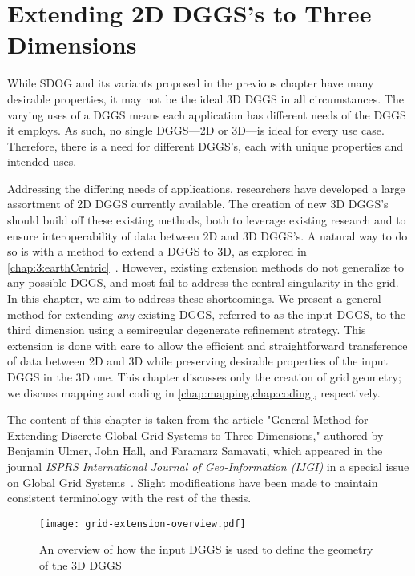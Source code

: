 \chapter{Extending 2D DGGS's to Three Dimensions} \label{chap:extension}
While SDOG and its variants proposed in the previous chapter have many desirable properties, it may not be the ideal 3D DGGS in all circumstances.
The varying uses of a DGGS means each application has different needs of the DGGS it employs.
As such, no single DGGS---2D or 3D---is ideal for every use case.
Therefore, there is a need for different DGGS's, each with unique properties and intended uses.


Addressing the differing needs of applications, researchers have developed a large assortment of 2D DGGS currently available.
The creation of new 3D DGGS's should build off these existing methods, both to leverage existing research and to ensure interoperability of data between 2D and 3D DGGS's.
A natural way to do so is with a method to extend a DGGS to 3D, as explored in \cref{chap:3:earthCentric}~\cite{xie2013interactive,sirdeshmukh2019utilizing,wang2013global}.
However, existing extension methods do not generalize to any possible DGGS, and most fail to address the central singularity in the grid.
In this chapter, we aim to address these shortcomings.
We present a general method for extending \textit{any} existing DGGS, referred to as the input DGGS, to the third dimension using a semiregular degenerate refinement strategy.
This extension is done with care to allow the efficient and straightforward transference of data between 2D and 3D while preserving desirable properties of the input DGGS in the 3D one.
This chapter discusses only the creation of grid geometry; we discuss mapping and coding in \cref{chap:mapping,chap:coding}, respectively.


The content of this chapter is taken from the article "General Method for Extending Discrete Global Grid Systems to Three Dimensions," authored by Benjamin Ulmer, John Hall, and Faramarz Samavati, which appeared in the journal \textit{ISPRS International Journal of Geo-Information (IJGI)} in a special issue on Global Grid Systems~\cite{ulmer2020general}.
Slight modifications have been made to maintain consistent terminology with the rest of the thesis.


\begin{figure}[ht!]
	\centering
	\texttt{[image: grid-extension-overview.pdf]}
	\caption[Overview of the grid extension method]{
		An overview of how the input DGGS is used to define the geometry of the 3D DGGS
	}
	\label{fig:extension}
\end{figure}


